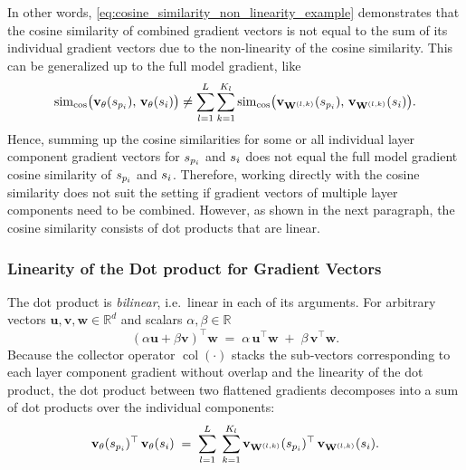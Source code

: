 In other words, \autoref{eq:cosine_similarity_non_linearity_example} demonstrates that the cosine similarity of combined gradient vectors is not equal to the sum of its individual gradient vectors due to the non-linearity of the cosine similarity. This can be generalized up to the full model gradient, like
\begin{equation}
\begin{split}
    \simcos\bigl(\vXspi,\,\vXsi\bigr) \neq \sum_{l=1}^{L} \sum_{k=1}^{K_l} \simcos\bigl( \vXspi[\Wlk], \, \vXsi[\Wlk] \bigr ).
    \label{eq:cosine_similarity_non_linearity_full}
\end{split}
\end{equation}
Hence, summing up the cosine similarities for some or all individual layer component gradient vectors for $\spi$ and $\si$ does not equal the full model gradient cosine similarity of $\spi$ and $\si$. Therefore, working directly with the cosine similarity does not suit the setting if gradient vectors of multiple layer components need to be combined. However, as shown in the next paragraph, the cosine similarity consists of dot products that are linear.

\subsubsection{Linearity of the Dot product for Gradient Vectors}
The dot product is \emph{bilinear}, i.e.\ linear in each of its arguments.
For arbitrary vectors $\mathbf{u},\mathbf{v},\mathbf{w}\in\mathbb{R}^d$ and
scalars $\alpha,\beta\in\mathbb{R}$
\begin{equation}
  (\alpha\mathbf{u}+\beta\mathbf{v})^{\top}\mathbf{w}
  \;=\;
  \alpha\,\mathbf{u}^{\top}\mathbf{w}
  \;+\;
  \beta\,\mathbf{v}^{\top}\mathbf{w}.
  \label{eq:dot_bilinear}
\end{equation}
Because the collector operator $\operatorname{col}(\cdot)$ stacks the sub‑vectors corresponding to each layer component gradient without overlap and the linearity of the dot product, the dot product between two flattened gradients decomposes into a sum of dot products over the individual components:
\begin{equation}
  \vXspi^{\top}\,\vXsi
  \;=\;
  \sum_{l=1}^{L}\;
  \sum_{k=1}^{K_l}
    \vXspi[\Wlk]^{\top}\,
    \vXsi[\Wlk].
  \label{eq:dot_grad_decompose}
\end{equation}

